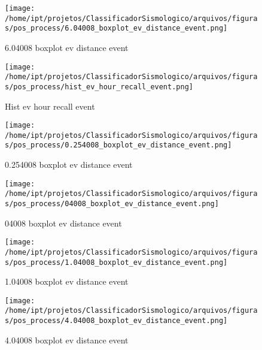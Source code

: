                     \begin{figure}[H]
                        \centering
                        \texttt{[image: /home/ipt/projetos/ClassificadorSismologico/arquivos/figuras/pos\_process/6.04008\_boxplot\_ev\_distance\_event.png]}
                        \caption{6.04008 boxplot ev distance event}
                        \label{fig:6.04008_boxplot_ev_distance_event}
                    \end{figure}
                

                    \begin{figure}[H]
                        \centering
                        \texttt{[image: /home/ipt/projetos/ClassificadorSismologico/arquivos/figuras/pos\_process/hist\_ev\_hour\_recall\_event.png]}
                        \caption{Hist ev hour recall event}
                        \label{fig:hist_ev_hour_recall_event}
                    \end{figure}
                

                    \begin{figure}[H]
                        \centering
                        \texttt{[image: /home/ipt/projetos/ClassificadorSismologico/arquivos/figuras/pos\_process/0.254008\_boxplot\_ev\_distance\_event.png]}
                        \caption{0.254008 boxplot ev distance event}
                        \label{fig:0.254008_boxplot_ev_distance_event}
                    \end{figure}
                

                    \begin{figure}[H]
                        \centering
                        \texttt{[image: /home/ipt/projetos/ClassificadorSismologico/arquivos/figuras/pos\_process/04008\_boxplot\_ev\_distance\_event.png]}
                        \caption{04008 boxplot ev distance event}
                        \label{fig:04008_boxplot_ev_distance_event}
                    \end{figure}
                

                    \begin{figure}[H]
                        \centering
                        \texttt{[image: /home/ipt/projetos/ClassificadorSismologico/arquivos/figuras/pos\_process/1.04008\_boxplot\_ev\_distance\_event.png]}
                        \caption{1.04008 boxplot ev distance event}
                        \label{fig:1.04008_boxplot_ev_distance_event}
                    \end{figure}
                

                    \begin{figure}[H]
                        \centering
                        \texttt{[image: /home/ipt/projetos/ClassificadorSismologico/arquivos/figuras/pos\_process/4.04008\_boxplot\_ev\_distance\_event.png]}
                        \caption{4.04008 boxplot ev distance event}
                        \label{fig:4.04008_boxplot_ev_distance_event}
                    \end{figure}
                